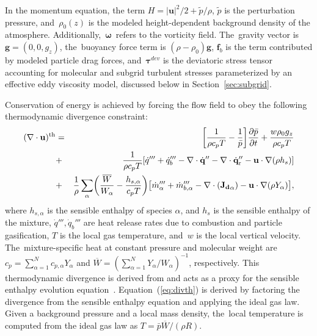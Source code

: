 \documentclass[atmosphere,article,accept,moreauthors,pdftex]{Definitions/mdpi}
\begin{document}
In the momentum equation, the term $H=|\mathbf{u}|^2/2 + \tilde{p}/\rho$, $\tilde{p}$ is the perturbation pressure, and~$\rho_0(z)$ is the modeled height-dependent background density of the atmosphere.  \mbox{Additionally, $\boldsymbol{\omega}$ refers} to the vorticity field. The~gravity vector is $\mathbf{g}=(0,0,g_z)$, the~buoyancy force term is $ (\rho-\rho_0) \mathbf{g}$, $\mathbf{f}_{b}$ is the term contributed by modeled particle drag forces, and~$\boldsymbol{\tau}^{dev}$ is the deviatoric stress tensor accounting for molecular and subgrid turbulent stresses parameterized by an effective eddy viscosity model, discussed below in Section~\ref{sec:subgrid}.

Conservation of energy is achieved by forcing the flow field to obey the following thermodynamic divergence constraint:
\begin{eqnarray}
    ( \nabla \cdot \mathbf{u} )^{\rm th} &=&
    \left[ \frac{1}{\rho c_p T} - \frac{1}{\bar{p}} \right]
    \frac{\partial \bar{p}}{\partial t} + \frac{w \rho_0 g_z}{\rho c_p T} \nonumber \\
    &+& \frac{1}{\rho c_p T} \left[ \dot{q}''' + \dot{q}_b''' - \nabla \cdot \dot{\mathbf{q}}'' - \nabla \cdot \dot{\mathbf{q}}_{\rm r}'' - \mathbf{u} \cdot \nabla (\rho h_s) \right] \nonumber \\
    &+& \frac{1}{\rho} \sum_\alpha \left( \frac{\overline{W}}{W_\alpha} - \frac{h_{s,\alpha}}{c_p T} \right) \left[ \dot{m}_\alpha'''  + \dot{m}_{b,\alpha}''' - \nabla \cdot (\mathbf{J_{d}}_\alpha) - \mathbf{u} \cdot \nabla (\rho Y_\alpha) \right] \label{eq:divth},
\end{eqnarray}
where $h_{s,\alpha}$ is the sensible enthalpy of species $\alpha$, and $h_s$ is the sensible enthalpy of the mixture, $\dot{q}''', \dot{q}_b'''$ are heat release rates due to combustion and particle gasification, $T$ is the local gas temperature, and~$w$ is the local vertical velocity. The~mixture-specific heat at constant pressure and molecular weight are $c_p=\sum_{\alpha =1}^N{c_{p,\alpha} Y_\alpha}$ and $\overline{W}=\left(\sum_{\alpha =1}^N{Y_\alpha /W_\alpha} \right)^{-1}$, respectively. This thermodynamic divergence is derived from and acts as a proxy for the sensible enthalpy evolution equation~\cite{mcdermo_2014}. Equation~(\ref{eq:divth}) is derived by factoring the divergence from the sensible enthalpy equation and applying the ideal gas law.  Given a background pressure and a local mass density, the~local temperature is computed from the ideal gas law as $T = \bar{p} \overline{W} / (\rho R) $.
\end{document}
